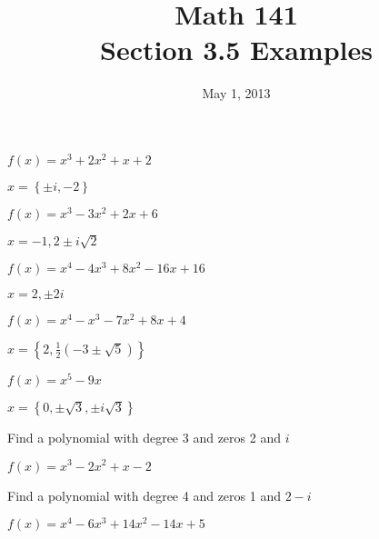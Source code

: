 \documentclass{exam}
\title{Math 141 \\ Section 3.5 Examples}
\date{May 1, 2013}
\begin{document}
\maketitle

\begin{questions}


  \question $f(x) = x^3+2 x^2+x+2$ 
  \label{factor:first}

    \begin{solution}
        $x = \left\{ \pm i, -2 \right\}$ 
    \end{solution}

  \question $f(x) = x^3-3 x^2+2 x+6$ 
    \begin{solution}
      $x = {-1, 2 \pm i \sqrt{2}}$ 
    \end{solution}

  \question $f(x) = x^4-4 x^3+8 x^2-16 x+16$
    \begin{solution}
      $x = {2, \pm 2i}$
    \end{solution}

  \question $f(x) = x^4-x^3-7 x^2+8 x+4$
    \begin{solution}
      $x = \left\{ 2, \frac{1}{2} \left(-3 \pm \sqrt{5}\right) \right\}$
    \end{solution}

  \question $f(x) = x^5 - 9x$ 
  \label{factor:last}
    \begin{solution}
      $x = \left\{ 0, \pm \sqrt{3}, \pm i \sqrt{3} \right\}$ 
    \end{solution}

  \question Find a polynomial with degree 3 and zeros 2 and $i$
    \begin{solution}
      $f(x) = x^3-2 x^2+x-2$
    \end{solution}

  \ifprintanswers
    \pagebreak
  \fi

  \question Find a polynomial with degree 4 and zeros 1 and $2 - i$
    \begin{solution}
      $f(x) = x^4-6 x^3+14 x^2-14 x+5$
    \end{solution}
\end{questions}
\end{document}
